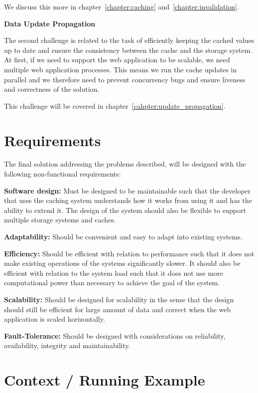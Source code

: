 We discuss this more in chapter~\ref{chapter:caching} and~\ref{chapter:invalidation}.

\textbf{Data Update Propagation}

The second challenge is related to the task of efficiently keeping the cached values up to date and ensure the consistency between the cache and the storage system. At first, if we need to support the web application to be scalable, we need multiple web application processes. This means we run the cache updates in parallel and we therefore need to prevent concurrency bugs and ensure liveness and correctness of the solution.

This challenge will be covered in chapter~\ref{cahpter:update_propagation}.


\section{Requirements}
\label{sec:requirements}

The final solution addressing the problems described, will be designed with the following non-functional requirements:

\textbf{Software design:} Must be designed to be maintainable such that the developer that uses the caching system understands how it works from using it and has the ability to extend it. The design of the system should also be flexible to support multiple storage systems and caches.

\textbf{Adaptability:} Should be convenient and easy to adapt into existing systems.

\textbf{Efficiency:} Should be efficient with relation to performance such that it does not make existing operations of the systems significantly slower. It should also be efficient with relation to the system load such that it does not use more computational power than necessary to achieve the goal of the system.

\textbf{Scalability:} Should be designed for scalability in the sense that the design should still be efficient for large amount of data and correct when the web application is scaled horizontally.

\textbf{Fault-Tolerance:} Should be designed with considerations on reliability, availability, integrity and maintainability.


\section{Context / Running Example}
\label{sec:context}

